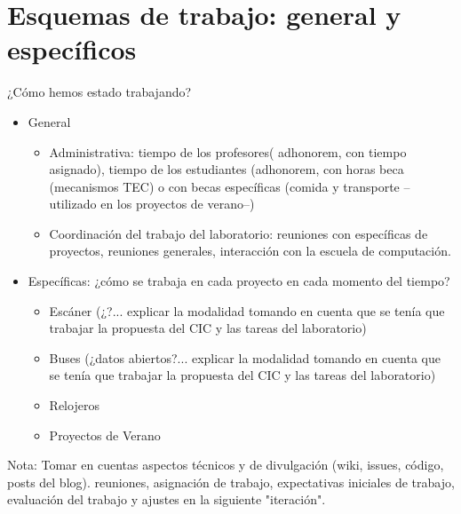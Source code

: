 \documentclass[conference]{IEEEtran}
\begin{document}
\section{Esquemas de trabajo: general y específicos}

¿Cómo hemos estado trabajando?

\begin{itemize}

\item General
    
    \begin{itemize}
    
    \item Administrativa: tiempo de los profesores( adhonorem, con tiempo
        asignado), tiempo de los estudiantes (adhonorem, con horas beca
        (mecanismos TEC) o con becas específicas (comida y transporte
        --utilizado en los proyectos de verano--)
    
    \item Coordinación del trabajo del laboratorio: reuniones con específicas de
        proyectos, reuniones generales, interacción con la escuela de
        computación.
    
    \end{itemize}

    \item Específicas: ¿cómo se trabaja en cada proyecto en cada momento del tiempo?
    
        \begin{itemize}
            \item Escáner (¿?... explicar la modalidad tomando en cuenta que se tenía
                que trabajar la propuesta del CIC y las tareas del laboratorio)
            
            \item Buses (¿datos abiertos?... explicar la modalidad tomando en cuenta que
                se tenía que trabajar la propuesta del CIC y las tareas del laboratorio)
            
            \item Relojeros
            
            \item Proyectos de Verano
        \end{itemize}

\end{itemize}
  
Nota: Tomar en cuentas aspectos técnicos y de divulgación (wiki, issues, código,
posts del blog).  reuniones, asignación de trabajo, expectativas iniciales de
trabajo, evaluación del trabajo y ajustes en la siguiente "iteración". 
\end{document}

